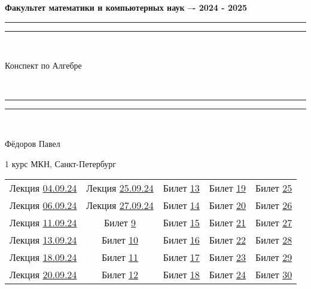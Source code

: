 \documentclass[12pt, a4paper]{article}
\theoremstyle{plain}
\theoremstyle{definition}
\begin{document}
\thispagestyle{empty}
\begin{center}
    \bf{Факультет математики и компьютерных наук –- 2024 - 2025}
\end{center}
\vspace{18mm}
\rule[0.5ex]{\linewidth}{2pt}\vspace*{-\baselineskip}\vspace*{3.2pt} 
\rule[0.5ex]{\linewidth}{1pt}\\[6mm] 
{ \sc \centerline{\huge Конспект по Алгебре}}\\[5mm] 
\rule[0.5ex]{\linewidth}{1pt}\vspace*{-\baselineskip}\vspace{3.2pt} 
\rule[0.5ex]{\linewidth}{2pt}\\ 
\vspace{5mm}
\begin{center}
    \Huge{Фёдоров Павел\\}
    \vspace{6mm}
    
    {\small 1 курс МКН, Санкт-Петербург}

\newpage

\Large
\hypertarget{p35}{}
\begin{tabular}{ccccc}
 Лекция \hyperlink{p1}{04.09.24} & Лекция \hyperlink{p7}{25.09.24} & Билет \hyperlink{p13}{13} & Билет \hyperlink{p19}{19} & Билет \hyperlink{p25}{25}\\
 Лекция \hyperlink{p2}{06.09.24} & Лекция \hyperlink{p8}{27.09.24} & Билет \hyperlink{p14}{14} & Билет \hyperlink{p20}{20} & Билет \hyperlink{p26}{26}\\
 Лекция \hyperlink{p3}{11.09.24} & Билет \hyperlink{p9}{9} & Билет \hyperlink{p15}{15} & Билет \hyperlink{p21}{21} & Билет \hyperlink{p27}{27}\\
 Лекция \hyperlink{p4}{13.09.24} & Билет \hyperlink{p10}{10} & Билет \hyperlink{p16}{16} & Билет \hyperlink{p22}{22} & Билет \hyperlink{p28}{28}\\
 Лекция \hyperlink{p5}{18.09.24} & Билет \hyperlink{p11}{11} & Билет \hyperlink{p17}{17} & Билет \hyperlink{p23}{23} & Билет \hyperlink{p29}{29}\\
 Лекция \hyperlink{p6}{20.09.24} & Билет \hyperlink{p12}{12} & Билет \hyperlink{p18}{18} & Билет \hyperlink{p24}{24} & Билет \hyperlink{p30}{30}\\
\end{tabular}
\end{center}

\normalsize
\hypertarget{p1}{}
\end{document}
